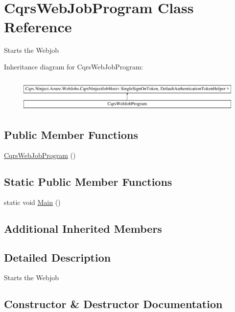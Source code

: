 \hypertarget{classCqrsWebJobProgram}{}\section{Cqrs\+Web\+Job\+Program Class Reference}
\label{classCqrsWebJobProgram}


Starts the Webjob  


Inheritance diagram for Cqrs\+Web\+Job\+Program\+:\begin{figure}[H]
\begin{center}
\leavevmode
\includegraphics[height=1.766562cm]{classCqrsWebJobProgram}
\end{center}
\end{figure}
\subsection*{Public Member Functions}
\begin{DoxyCompactItemize}
\item 
\hyperlink{classCqrsWebJobProgram_aef553539b5ec25d0cdb061fd9895c851_aef553539b5ec25d0cdb061fd9895c851}{Cqrs\+Web\+Job\+Program} ()
\end{DoxyCompactItemize}
\subsection*{Static Public Member Functions}
\begin{DoxyCompactItemize}
\item 
static void \hyperlink{classCqrsWebJobProgram_ab11d66be0194de537cb7ae73e74c2181_ab11d66be0194de537cb7ae73e74c2181}{Main} ()
\end{DoxyCompactItemize}
\subsection*{Additional Inherited Members}


\subsection{Detailed Description}
Starts the Webjob 



\subsection{Constructor \& Destructor Documentation}
\mbox{\label{classCqrsWebJobProgram_aef553539b5ec25d0cdb061fd9895c851_aef553539b5ec25d0cdb061fd9895c851}} 
